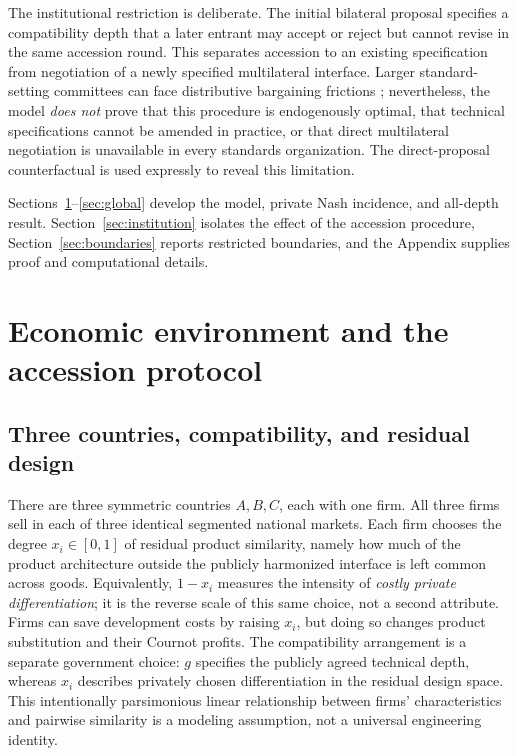 \documentclass[11pt,a4paper]{article}
\theoremstyle{remark}\newtheorem{remark}[theorem]{Remark}
\begin{document}
The institutional restriction is deliberate. The initial bilateral proposal specifies a compatibility depth that a later entrant may accept or reject but cannot revise in the same accession round. This separates accession to an existing specification from negotiation of a newly specified multilateral interface. Larger standard-setting committees can face distributive bargaining frictions \citep{Simcoe2012}; nevertheless, the model \emph{does not} prove that this procedure is endogenously optimal, that technical specifications cannot be amended in practice, or that direct multilateral negotiation is unavailable in every standards organization. The direct-proposal counterfactual is used expressly to reveal this limitation.

Sections~\ref{sec:model}--\ref{sec:global} develop the model, private Nash incidence, and all-depth result. Section~\ref{sec:institution} isolates the effect of the accession procedure, Section~\ref{sec:boundaries} reports restricted boundaries, and the Appendix supplies proof and computational details.

\section{Economic environment and the accession protocol}\label{sec:model}
\subsection{Three countries, compatibility, and residual design}
There are three symmetric countries $A,B,C$, each with one firm. All three firms sell in each of three identical segmented national markets. Each firm chooses the degree $x_i\in[0,1]$ of residual product similarity, namely how much of the product architecture outside the publicly harmonized interface is left common across goods. Equivalently, $1-x_i$ measures the intensity of \emph{costly private differentiation}; it is the reverse scale of this same choice, not a second attribute. Firms can save development costs by raising $x_i$, but doing so changes product substitution and their Cournot profits. The compatibility arrangement is a separate government choice: $g$ specifies the publicly agreed technical depth, whereas $x_i$ describes privately chosen differentiation in the residual design space. This intentionally parsimonious linear relationship between firms' characteristics and pairwise similarity is a modeling assumption, not a universal engineering identity.
\end{document}
